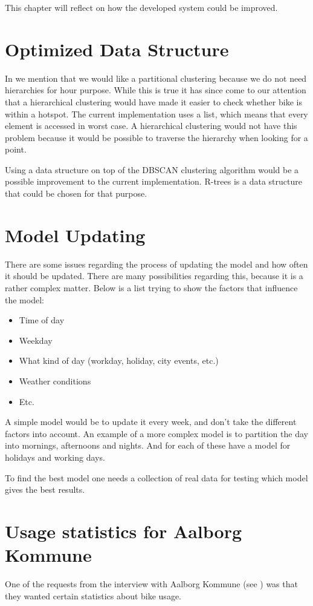 This chapter will reflect on how the developed system could be improved.

\section{Optimized Data Structure}\label{ref:ods}
In \cite{data_purporse} we mention that we would like a partitional clustering because we do not need hierarchies for hour purpose.
While this is true it has since come to our attention that a hierarchical clustering would have made it easier to check whether bike is within a hotspot.
The current implementation uses a list, which means that every element is accessed in worst case.
A hierarchical clustering would not have this problem because it would be possible to traverse the hierarchy when looking for a point.

Using a data structure on top of the DBSCAN clustering algorithm would be a possible improvement to the current implementation.
R-trees\cite[Section 25.3.5.3]{database_system_concepts} is a data structure that could be chosen for that purpose.

\section{Model Updating}\label{reflection:model_updating}
There are some issues regarding the process of updating the model and how often it should be updated.
There are many possibilities regarding this, because it is a rather complex matter.
Below is a list trying to show the factors that influence the model:
\begin{itemize}
\item Time of day
\item Weekday
\item What kind of day (workday, holiday, city events, etc.)
\item Weather conditions
\item Etc.
\end{itemize}
A simple model would be to update it every week, and don't take the different factors into account.
An example of a more complex model is to partition the day into mornings, afternoons and nights.
And for each of these have a model for holidays and working days.

To find the best model one needs a collection of real data for testing which model gives the best results.

\section{Usage statistics for Aalborg Kommune}
One of the requests from the interview with Aalborg Kommune (see ) was that they wanted certain statistics about bike usage.

